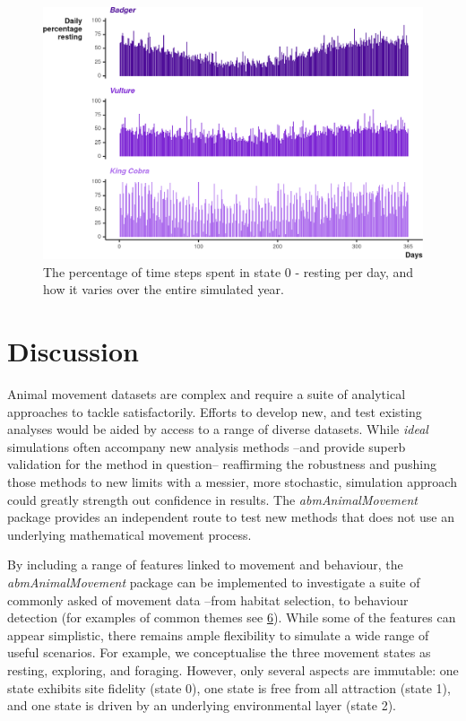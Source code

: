 \documentclass[10pt,a4paper]{article}
\begin{document}
\begin{figure}

{\centering \includegraphics{Agent-based_model_walkthrough_files/figure-latex/cycleSeasonalFigure-1} 

}

\caption{The percentage of time steps spent in state 0 - resting per day, and how it varies over the entire simulated year.}\label{fig:cycleSeasonalFigure}
\end{figure}

\hypertarget{discussion}{%
\section{Discussion}\label{discussion}}

Animal movement datasets are complex and require a suite of analytical approaches to tackle satisfactorily.
Efforts to develop new, and test existing analyses would be aided by access to a range of diverse datasets.
While \emph{ideal} simulations often accompany new analysis methods --and provide superb validation for the method in question-- reaffirming the robustness and pushing those methods to new limits with a messier, more stochastic, simulation approach could greatly strength out confidence in results.
The \emph{abmAnimalMovement} package provides an independent route to test new methods that does not use an underlying mathematical movement process.

By including a range of features linked to movement and behaviour, the \emph{abmAnimalMovement} package can be implemented to investigate a suite of commonly asked of movement data --from habitat selection, to behaviour detection (for examples of common themes see \protect\hyperlink{ref-joo_recent_2022}{6}).
While some of the features can appear simplistic, there remains ample flexibility to simulate a wide range of useful scenarios.
For example, we conceptualise the three movement states as resting, exploring, and foraging.
However, only several aspects are immutable: one state exhibits site fidelity (state 0), one state is free from all attraction (state 1), and one state is driven by an underlying environmental layer (state 2).
\end{document}

